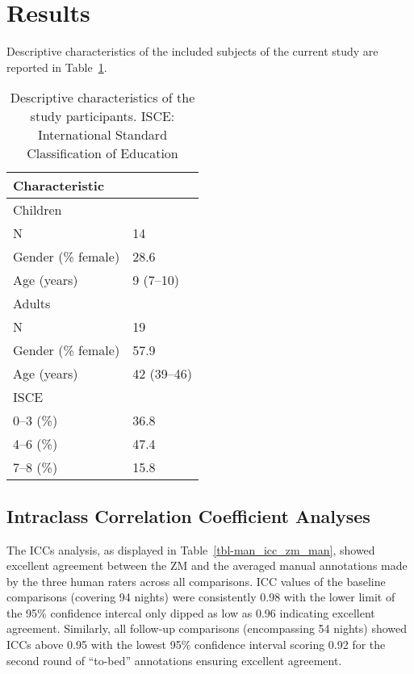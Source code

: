 \documentclass[
  10pt,
]{scrbook}
\begin{document}
\hypertarget{results}{%
\section{Results}\label{results}}

Descriptive characteristics of the included subjects of the current
study are reported in Table~\ref{tbl-man_describe}.

\begingroup

\footnotesize

\hypertarget{tbl-man_describe}{}
\begin{longtable}{ll}
\caption{\label{tbl-man_describe}Descriptive characteristics of the study participants. ISCE:
International Standard Classification of Education }\tabularnewline

\toprule
Characteristic &  \\ 
\midrule
\multicolumn{2}{l}{Children} \\ 
\midrule
N & 14 \\ 
Gender (\% female) & 28.6 \\ 
Age (years) & 9 (7–10) \\ 
\midrule
\multicolumn{2}{l}{Adults} \\ 
\midrule
N & 19 \\ 
Gender (\% female) & 57.9 \\ 
Age (years) & 42 (39–46) \\ 
ISCE &  \\ 
0–3 (\%) & 36.8 \\ 
4–6 (\%) & 47.4 \\ 
7–8 (\%) & 15.8 \\ 
\bottomrule
\end{longtable}

\endgroup

\hypertarget{intraclass-correlation-coefficient-analyses}{%
\subsection{Intraclass Correlation Coefficient
Analyses}\label{intraclass-correlation-coefficient-analyses}}

The ICCs analysis, as displayed in Table~\ref{tbl-man_icc_zm_man},
showed excellent agreement between the ZM and the averaged manual
annotations made by the three human raters across all comparisons. ICC
values of the baseline comparisons (covering 94 nights) were
consistently 0.98 with the lower limit of the 95\% confidence intercal
only dipped as low as 0.96 indicating excellent agreement. Similarly,
all follow-up comparisons (encompassing 54 nights) showed ICCs above
0.95 with the lowest 95\% confidence interval scoring 0.92 for the
second round of ``to-bed'' annotations ensuring excellent agreement.
\end{document}
